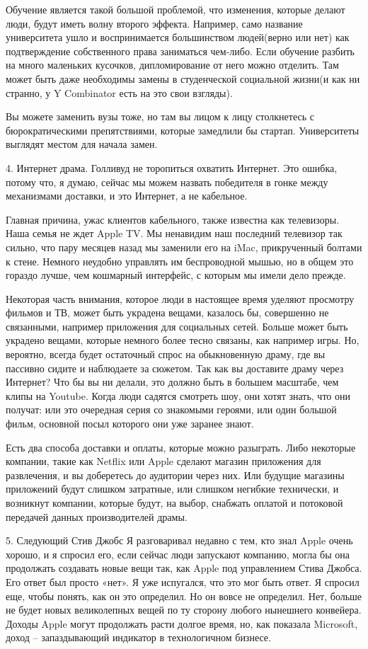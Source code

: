\documentclass[ebook,12pt,oneside,openany]{memoir}
\begin{document}
Обучение является такой большой проблемой, что изменения, которые
делают люди, будут иметь волну второго эффекта. Например, само
название университета ушло и воспринимается большинством людей(верно
или нет) как подтверждение собственного права заниматься чем-либо.
Если обучение разбить на много маленьких кусочков, дипломирование от
него можно отделить. Там может быть даже необходимы замены в
студенческой социальной жизни(и как ни странно, у Y Combinator есть на
это свои взгляды).

Вы можете заменить вузы тоже, но там вы лицом к лицу столкнетесь с
бюрократическими препятствиями, которые замедлили бы стартап.
Университеты выглядят местом для начала замен.

4. Интернет драма. Голливуд не торопиться охватить Интернет. Это
ошибка, потому что, я думаю, сейчас мы можем назвать победителя в
гонке между механизмами доставки, и это Интернет, а не кабельное.

Главная причина, ужас клиентов кабельного, также известна как
телевизоры. Наша семья не ждет Apple TV. Мы ненавидим наш последний
телевизор так сильно, что пару месяцев назад мы заменили его на iMac,
прикрученный болтами к стене. Немного неудобно управлять им
беспроводной мышью, но в общем это гораздо лучше, чем кошмарный
интерфейс, с которым мы имели дело прежде.

Некоторая часть внимания, которое люди в настоящее время уделяют
просмотру фильмов и ТВ, может быть украдена вещами, казалось бы,
совершенно не связанными, например приложения для социальных сетей.
Больше может быть украдено вещами, которые немного более тесно
связаны, как например игры. Но, вероятно, всегда будет остаточный
спрос на обыкновенную драму, где вы пассивно сидите и наблюдаете за
сюжетом. Так как вы доставите драму через Интернет? Что бы вы ни
делали, это должно быть в большем масштабе, чем клипы на Youtube.
Когда люди садятся смотреть шоу, они хотят знать, что они получат: или
это очередная серия со знакомыми героями, или один большой фильм,
основной посыл которого они уже заранее знают.

Есть два способа доставки и оплаты, которые можно разыграть. Либо
некоторые компании, такие как Netflix или Apple сделают магазин
приложения для развлечения, и вы доберетесь до аудитории через них.
Или будущие магазины приложений будут слишком затратные, или слишком
негибкие технически, и возникнут компании, которые будут, на выбор,
снабжать оплатой и потоковой передачей данных производителей драмы.

5. Следующий Стив Джобс Я разговаривал недавно с тем, кто знал Apple
очень хорошо, и я спросил его, если сейчас люди запускают компанию,
могла бы она продолжать создавать новые вещи так, как Apple под
управлением Стива Джобса. Его ответ был просто «нет». Я уже испугался,
что это мог быть ответ. Я спросил еще, чтобы понять, как он это
определил. Но он вовсе не определил. Нет, больше не будет новых
великолепных вещей по ту сторону любого нынешнего конвейера. Доходы
Apple могут продолжать расти долгое время, но, как показала Microsoft,
доход – запаздывающий индикатор в технологичном бизнесе.
\end{document}
